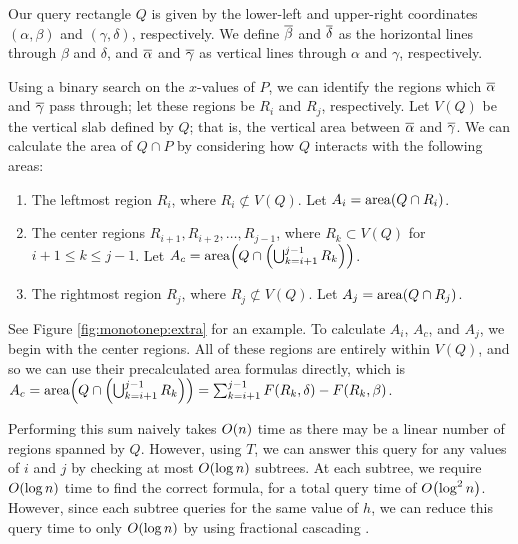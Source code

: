Our query rectangle $Q$ is given by the lower-left and upper-right coordinates 
$(\alpha, \beta)$ and $(\gamma, \delta)$, respectively. We define 
$\overline{\beta}$ and $\overline{\delta}$ as the horizontal lines through $\beta$ and 
$\delta$, and $\overline{\alpha}$ and $\overline{\gamma}$ as vertical lines through 
$\alpha$ and $\gamma$, respectively.

Using a binary search on the $x$-values of $P$, we can identify the regions 
which $\overline{\alpha}$ and $\overline{\gamma}$ pass through; let these regions be 
$R_i$ and $R_j$, respectively.
Let $V(Q)$ be the vertical slab defined by $Q$; that is, the vertical area 
between $\overline{\alpha}$ and $\overline{\gamma}$.
We can calculate the area of $Q \cap P$ by considering how $Q$ interacts with 
the following areas:

\begin{enumerate}
 \item The leftmost region $R_i$, where $R_i \not \subset V(Q)$. Let $A_i = 
\operatorname{area}\!\left(Q \cap R_i\right)$.
 \item The center regions $R_{i+1}, R_{i+2}, \ldots, R_{j-1}$, where  $R_k 
\subset V(Q)$ for $i + 1 \leq k \leq j -1$. Let $A_c = \operatorname{area}\!\left(Q \cap \left ( 
\bigcup_{k=i+1}^{j-1}{R_k} \right )\right)$.
 \item The rightmost region $R_j$, where $R_j \not \subset V(Q)$. Let $A_j = 
\operatorname{area}\!\left(Q \cap R_j\right)$.
\end{enumerate}

See Figure \ref{fig:monotonep:extra} for an example. To calculate $A_i$, $A_c$, 
and $A_j$, we begin with the center regions. All of these regions are entirely 
within $V(Q)$, and so we can use their precalculated area formulas directly,  
which is
$A_c = \operatorname{area}\!\left(Q \cap \left ( \bigcup_{k=i+1}^{j-1}{R_k} \right )\right)
= \sum_{k=i+1}^{j-1} F(R_k, \delta) - F(R_k, \beta)$.

  Performing this sum naively takes $O\!\left(n\right)$ time as there may be a linear 
number of regions spanned by $Q$.
However, using $T$, we can answer this query for any values of $i$ and $j$ by 
checking at most $O\!\left(\log{n}\right)$ subtrees. 
At each subtree, we require $O\!\left(\log{n}\right)$ time to find the correct formula, 
for a total query time of $O\!\left(\log^2{n}\right)$.
However, since each subtree queries for the same value of $h$, we can reduce 
this query time to only $O\!\left(\log{n}\right)$ by using fractional 
cascading \cite{cg-fc-86, cg-fc2-86}.

